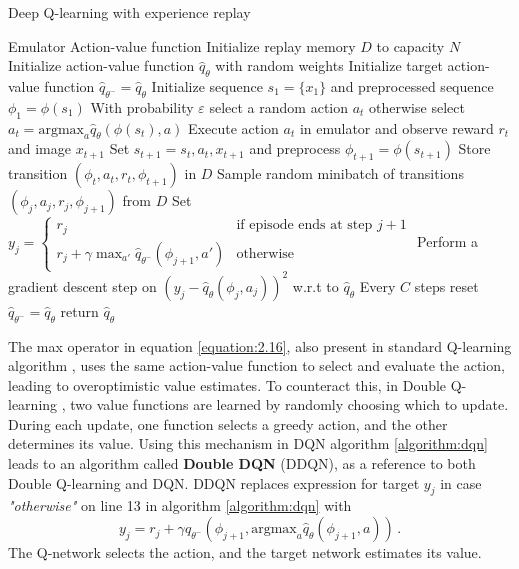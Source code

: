 \begin{algorithm}[H]
	\caption{Deep Q-learning with experience replay} \label{algorithm:dqn}
	\begin{algorithmic}[1]
	\renewcommand{\algorithmicrequire}{\hspace*{\algorithmicindent}  \textbf{Input:}}
	\renewcommand{\algorithmicensure}{\hspace*{\algorithmicindent}  \textbf{Output:}}
	\Require Emulator
	\Ensure Action-value function
	\State Initialize replay memory $D$ to capacity $N$
	\State Initialize action-value function $\hat{q}_\theta$ with random weights
	\State Initialize target action-value function $\hat{q}_{\theta^-} = \hat{q}_\theta$
		\State Initialize sequence $s_1 = \{x_1\}$ and preprocessed sequence $\phi_1 = \phi(s_1)$
			\State With probability $\varepsilon$ select a random action $a_t$
			\State otherwise select $a_t = \text{argmax}_a \hat{q}_\theta(\phi(s_t), a)$
			\State Execute action $a_t$ in emulator and observe reward $r_t$ and image $x_{t+1}$
			\State Set $s_{t+1} = s_t, a_t, x_{t+1}$ and preprocess $\phi_{t+1} = \phi(s_{t+1})$
			\State Store transition $(\phi_t, a_t, r_t, \phi_{t+1})$ in $D$
			\State Sample random minibatch of transitions $(\phi_j, a_j, r_j, \phi_{j+1})$ from $D$
			\State Set $ y_j = \begin{cases} r_j & \mbox{if episode ends at step } j+1 \\ r_j + \gamma \max_{a'}\hat{q}_{\theta^-}(\phi_{j+1}, a') & \mbox{otherwise} \end{cases}$
			\State Perform a gradient descent step on $(y_j - \hat{q}_\theta(\phi_j, a_j))^2$ w.r.t to $\hat{q}_\theta$
			\State Every $C$ steps reset $\hat{q}_{\theta^-} = \hat{q}_{\theta}$
		\EndFor
	\EndFor
	\State return $\hat{q}_\theta$
\end{algorithmic}
\end{algorithm}

The max operator in equation \ref{equation:2.16}, also present in standard Q-learning algorithm \cite{watkins1992q}, uses the same action-value function to select and evaluate the action, leading to overoptimistic value estimates. To counteract this, in Double Q-learning \cite{hasselt2010double}, two value functions are learned by randomly choosing which to update. During each update, one function selects a greedy action, and the other determines its value. Using this mechanism in DQN algorithm \ref{algorithm:dqn} leads to an algorithm called \textbf{Double DQN} \label{Double DQN} \cite{Hasselt_Guez_Silver_2016} (DDQN), as a reference to both Double Q-learning and DQN. DDQN replaces expression for target $y_j$ in case \textit{"otherwise"} on line 13 in algorithm \ref{algorithm:dqn} with \cite{Hasselt_Guez_Silver_2016}
\begin{equation}
	y_j = r_j + \gamma \hat{q}_{\theta^-}(\phi_{j+1}, \text{argmax}_a \hat{q}_\theta(\phi_{j+1}, a)) \, .
\end{equation}
The Q-network selects the action, and the target network estimates its value.
